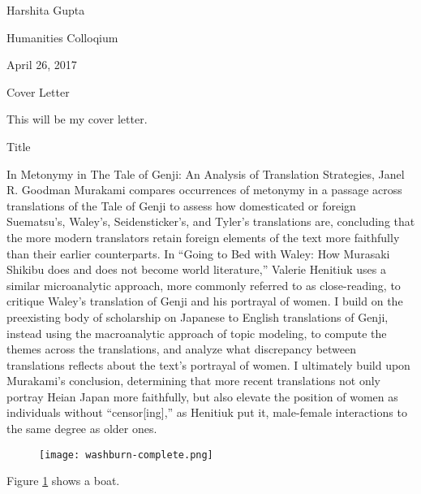 \documentclass[12pt]{article}
\newenvironment{coverletter}{\begin{center} Cover Letter \end{center}}{\newpage }
\begin{document}
\begin{flushleft}
	

\begin{spacing}{2.0}
Harshita Gupta

Humanities Colloqium 

April 26, 2017

\begin{coverletter}
	This will be my cover letter.
\end{coverletter}
	

\begin{center}
Title
\end{center}

\setlength{\parindent}{0.5in} 

In Metonymy in The Tale of Genji: An Analysis of Translation Strategies, Janel R. Goodman Murakami compares occurrences of metonymy in a passage across translations of the Tale of Genji to assess how domesticated or foreign Suematsu’s, Waley’s, Seidensticker’s, and Tyler’s translations are, concluding that the more modern translators retain foreign elements of the text more faithfully than their earlier counterparts. In “Going to Bed with Waley: How Murasaki Shikibu does and does not become world literature,” Valerie Henitiuk uses a similar microanalytic approach, more commonly referred to as close-reading, to critique Waley’s translation of Genji and his portrayal of women. I build on the preexisting body of scholarship on Japanese to English translations of Genji, instead using the macroanalytic approach of topic modeling, to compute the themes across the translations, and analyze what discrepancy between translations reflects about the text’s portrayal of women. I ultimately build upon Murakami’s conclusion, determining that more recent translations not only portray Heian Japan more faithfully, but also elevate the position of women as individuals without “censor[ing],” as Henitiuk put it, male-female interactions to the same degree as older ones. 

\begin{figure}
  \texttt{[image: washburn-complete.png]}
  \caption{}
  \label{fig:boat1}
\end{figure}

Figure \ref{fig:boat1} shows a boat.


\end{spacing}
\end{flushleft}
\end{document}
